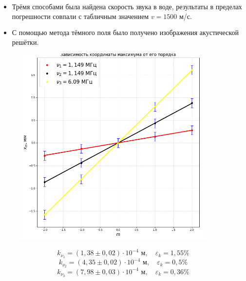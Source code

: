 \documentclass[a4paper,12pt]{article}
\begin{document}
\begin{itemize}
    \item Трёмя способами была найдена скорость звука в воде, результаты в пределах погрешности совпали с табличным значением $v = 1500$ м/с.
    
    \item
   С помощью метода тёмного поля было получено изображения акустической решётки.
\end{itemize}

\newpage
\begin{figure}[H]\label{fig: x_m(m)}
    \centering
    \includegraphics[width = 0.9\textwidth]{x_m(m).png}
\end{figure}
\[k_{\nu_1} = (1,38 \pm 0,02)\cdot 10^{-4} \text{ м}, \quad \varepsilon_k = 1,55 \%\]
\[k_{\nu_2} = (4,35 \pm 0,02)\cdot 10^{-4} \text{ м}, \quad \varepsilon_k = 0,5 \%\]
\[k_{\nu_3} = (7,98 \pm 0,03)\cdot 10^{-4} \text{ м}, \quad \varepsilon_k = 0,36 \%\]

\end{document}
